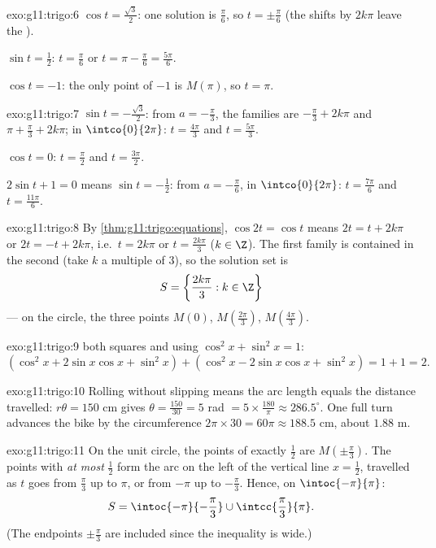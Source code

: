 \begin{solution}{exo:g11:trigo:6}
$\cos t = \frac{\sqrt3}{2}$: one solution is $\frac\pi6$, so
$t = \pm\frac\pi6$ (the shifts by $2k\pi$ leave the ).

$\sin t = \frac12$: $t = \frac\pi6$ or $t = \pi - \frac\pi6 =
\frac{5\pi}{6}$.

$\cos t = -1$: the only point of  $-1$ is $M(\pi)$, so $t = \pi$.
\end{solution}

\begin{solution}{exo:g11:trigo:7}
$\sin t = -\frac{\sqrt3}{2}$: from $a = -\frac\pi3$, the families are
$-\frac\pi3 + 2k\pi$ and $\pi + \frac\pi3 + 2k\pi$; in
$\intco{0}{2\pi}$: $t = \frac{4\pi}{3}$ and $t = \frac{5\pi}{3}$.

$\cos t = 0$: $t = \frac\pi2$ and $t = \frac{3\pi}{2}$.

$2\sin t + 1 = 0$ means $\sin t = -\frac12$: from $a = -\frac\pi6$, in
$\intco{0}{2\pi}$: $t = \frac{7\pi}{6}$ and $t = \frac{11\pi}{6}$.
\end{solution}

\begin{solution}{exo:g11:trigo:8}
By \cref{thm:g11:trigo:equations}, $\cos 2t = \cos t$ means
$2t = t + 2k\pi$ or $2t = -t + 2k\pi$, i.e.\ $t = 2k\pi$ or
$t = \frac{2k\pi}{3}$ ($k \in \Z$). The first family is contained in the
second (take $k$ a multiple of $3$), so the solution set is
\[
S = \left\{\frac{2k\pi}{3} : k \in \Z\right\}
\]
--- on the circle, the three points $M(0)$,
$M\!\left(\frac{2\pi}{3}\right)$, $M\!\left(\frac{4\pi}{3}\right)$.
\end{solution}

\begin{solution}{exo:g11:trigo:9}
 both squares and using $\cos^2 x + \sin^2 x = 1$:
\[
(\cos^2 x + 2\sin x\cos x + \sin^2 x)
+ (\cos^2 x - 2\sin x\cos x + \sin^2 x)
= 1 + 1 = 2 .
\]
\end{solution}

\begin{solution}{exo:g11:trigo:10}
Rolling without slipping means the arc length equals the distance
travelled: $r\theta = 150$ cm gives
$\theta = \frac{150}{30} = 5$ rad $= 5 \times \frac{180}{\pi} \approx
286.5^\circ$. One full turn advances the bike by the circumference
$2\pi \times 30 = 60\pi \approx 188.5$ cm, about $1.88$ m.
\end{solution}

\begin{solution}{exo:g11:trigo:11}
On the unit circle, the points of  exactly $\frac12$ are
$M\!\left(\pm\frac\pi3\right)$. The points with  \emph{at most}
$\frac12$ form the arc on the left of the vertical line $x = \frac12$,
travelled as $t$ goes from $\frac\pi3$ up to $\pi$, or from $-\pi$ up to
$-\frac\pi3$. Hence, on $\intoc{-\pi}{\pi}$:
\[
S = \intoc{-\pi}{-\frac{\pi}{3}} \cup \intcc{\frac{\pi}{3}}{\pi}.
\]
(The endpoints $\pm\frac\pi3$ are included since the inequality is wide.)
\end{solution}
